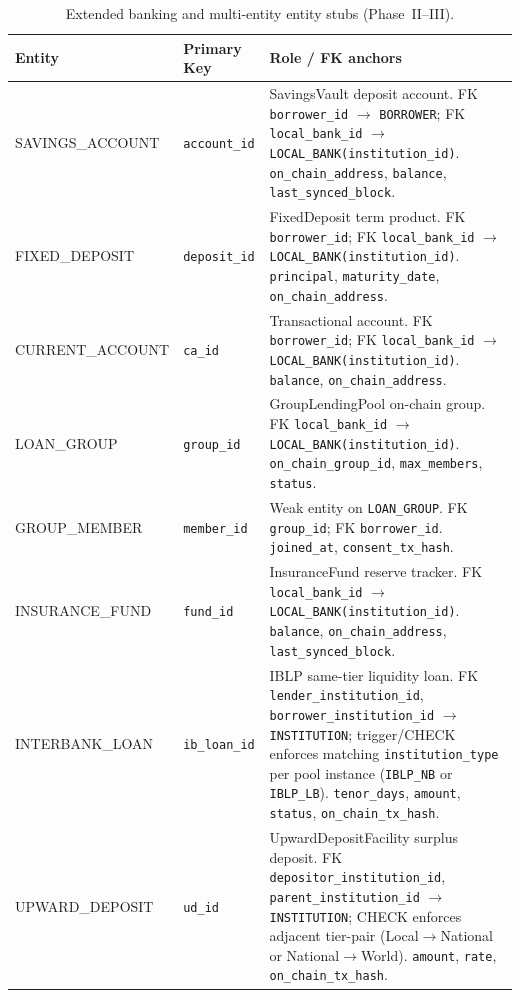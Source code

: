\documentclass[12pt,a4paper]{report}
\newcommand{\tableheadcolor}{\rowcolor{TableHeadBg}}
\begin{document}
\begin{table}[H]
\centering
\caption[Extended banking and multi-entity entity stubs (Phase~II--III)]{Extended banking and multi-entity entity stubs (Phase~II--III).}
\label{tab:db-entities-ext2}
\small
\begin{tabular}{@{}p{3.2cm}p{3.0cm}p{6.5cm}@{}}
\toprule
\tableheadcolor
\textbf{Entity} & \textbf{Primary Key} & \textbf{Role / FK anchors} \\
\midrule
SAVINGS\_ACCOUNT & \texttt{account\_id} & SavingsVault deposit account. FK \texttt{borrower\_id} $\to$ \texttt{BORROWER}; FK \texttt{local\_bank\_id} $\to$ \texttt{LOCAL\_BANK(institution\_id)}. \texttt{on\_chain\_address}, \texttt{balance}, \texttt{last\_synced\_block}. \\
FIXED\_DEPOSIT & \texttt{deposit\_id} & FixedDeposit term product. FK \texttt{borrower\_id}; FK \texttt{local\_bank\_id} $\to$ \texttt{LOCAL\_BANK(institution\_id)}. \texttt{principal}, \texttt{maturity\_date}, \texttt{on\_chain\_address}. \\
CURRENT\_ACCOUNT & \texttt{ca\_id} & Transactional account. FK \texttt{borrower\_id}; FK \texttt{local\_bank\_id} $\to$ \texttt{LOCAL\_BANK(institution\_id)}. \texttt{balance}, \texttt{on\_chain\_address}. \\
LOAN\_GROUP & \texttt{group\_id} & GroupLendingPool on-chain group. FK \texttt{local\_bank\_id} $\to$ \texttt{LOCAL\_BANK(institution\_id)}. \texttt{on\_chain\_group\_id}, \texttt{max\_members}, \texttt{status}. \\
GROUP\_MEMBER & \texttt{member\_id} & Weak entity on \texttt{LOAN\_GROUP}. FK \texttt{group\_id}; FK \texttt{borrower\_id}. \texttt{joined\_at}, \texttt{consent\_tx\_hash}. \\
INSURANCE\_FUND & \texttt{fund\_id} & InsuranceFund reserve tracker. FK \texttt{local\_bank\_id} $\to$ \texttt{LOCAL\_BANK(institution\_id)}. \texttt{balance}, \texttt{on\_chain\_address}, \texttt{last\_synced\_block}. \\
\midrule
INTERBANK\_LOAN & \texttt{ib\_loan\_id} & IBLP same-tier liquidity loan. FK \texttt{lender\_institution\_id}, \texttt{borrower\_institution\_id} $\to$ \texttt{INSTITUTION}; trigger/CHECK enforces matching \texttt{institution\_type} per pool instance (\texttt{IBLP\_NB} or \texttt{IBLP\_LB}). \texttt{tenor\_days}, \texttt{amount}, \texttt{status}, \texttt{on\_chain\_tx\_hash}. \\
UPWARD\_DEPOSIT & \texttt{ud\_id} & UpwardDepositFacility surplus deposit. FK \texttt{depositor\_institution\_id}, \texttt{parent\_institution\_id} $\to$ \texttt{INSTITUTION}; CHECK enforces adjacent tier-pair (Local$\to$National or National$\to$World). \texttt{amount}, \texttt{rate}, \texttt{on\_chain\_tx\_hash}. \\

\end{tabular}
\end{table}
\end{document}
